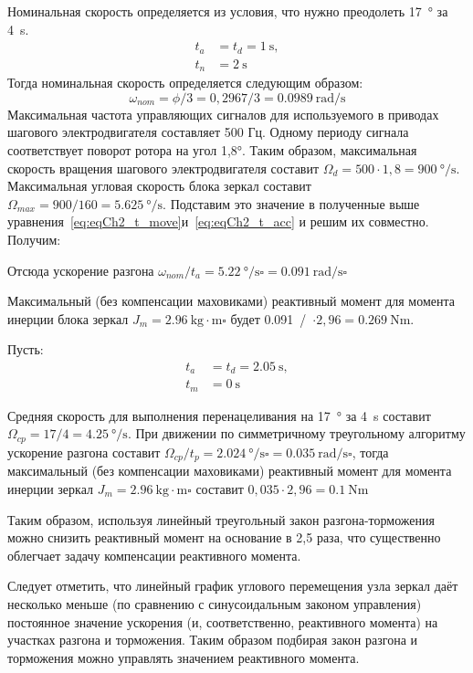 Номинальная скорость определяется из условия, что нужно преодолеть \SI{17}{\degree} за \SI{4}{\second}.
\begin{align*}
	t_a &= t_d = \SI{1}{\second}, \\
	t_n &= \SI{2}{\second}
\end{align*}
Тогда номинальная скорость определяется следующим образом:
\[
\omega_{nom} = \phi / 3 = 0,2967/3 = \SI{0.0989}{\radian/\second} 
\]
Максимальная частота управляющих сигналов для используемого в приводах шагового электродвигателя составляет 500 Гц. Одному периоду сигнала соответствует поворот ротора на угол 1,8°. Таким образом, максимальная скорость вращения шагового электродвигателя составит $\Omega_{d} = 500 \cdot 1,8 = \SI{900} {\degree/ \second}$. Максимальная угловая скорость блока зеркал составит $\Omega_{max}= 900/160 = \SI{5,625}{\degree/ \second}$. Подставим это значение в полученные выше уравнения~\cref{eq:eqCh2_t_move}и~\cref{eq:eqCh2_t_acc} и решим их совместно. Получим:


Отсюда ускорение разгона $\omega_{nom} / t_a = \SI{5,22}{\degree/\second\square} = \SI{0,091}{\radian/\second\square}$


Максимальный (без компенсации маховиками) реактивный момент для момента инерции блока зеркал $J_m = \SI{2,96}{\kilogram\cdot\meter\square}$ будет \mbox{\SI{0,091}{\radian / \second\square}  $\cdot 2,96 = \SI{0,269}{\newton\meter}$}.

Пусть:
\begin{align*}
	t_a &= t_d = \SI{2,05}{\second}, \\
	t_m &= \SI{0}{\second}
\end{align*}

Средняя скорость для выполнения перенацеливания на \SI{17}{\degree}
за \SI{4}{\second} составит $\Omega_{cp} = 17 / 4 = \SI{4,25}{\degree / \second}$. При движении по симметричному треугольному алгоритму ускорение разгона составит $\Omega_{cp} / t_p = \SI{2,024}{\degree / \second\square} = \SI{0,035}{\radian / \second\square}$, тогда максимальный (без компенсации маховиками) реактивный момент для момента инерции зеркал $J_m = \SI{2,96}{\kilogram \cdot \meter\square}$ составит $0,035 \cdot 2,96 = \SI{0,1}{\newton\meter}$

Таким образом, используя линейный треугольный закон разгона-торможения можно снизить реактивный момент на основание в 2,5 раза, что существенно облегчает задачу компенсации реактивного момента.

Следует отметить, что линейный график углового перемещения узла зеркал даёт несколько меньше (по сравнению с синусоидальным законом управления) постоянное значение ускорения (и, соответственно, реактивного момента) на участках разгона и торможения. Таким образом подбирая закон разгона и торможения можно управлять значением реактивного момента.

